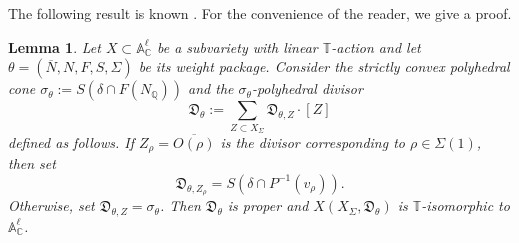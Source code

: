 \documentclass[11pt, reqno]{amsart}
\theoremstyle{plain}
\newtheorem{lemma}[theorem]{Lemma}
\theoremstyle{definition}
\theoremstyle{remark}
\begin{document}
The following result is known \cite[Section 4]{AIPSV12}. For the convenience of the reader, we give a proof.
\begin{lemma}\label{lem-poltheta}
Let $X\subset \mathbb{A}^{\ell}_{\mathbb{C}}$ be a subvariety with linear $\mathbb{T}$-action  and  let $\theta =  (\overline{N}, N, F, S, \Sigma)$ be its weight package. Consider the strictly convex polyhedral cone $\sigma_{\theta}:= S(\delta\cap F(N_{\mathbb{Q}}))$ and the $\sigma_{\theta}$-polyhedral divisor 
$$\mathfrak{D}_{\theta}:= \sum_{Z\subset  X_{\Sigma}} \mathfrak{D}_{\theta, Z}\cdot [Z]$$
defined as follows. If $Z_{\rho} =  \overline{O(\rho)}$ is the divisor corresponding to $\rho\in \Sigma(1)$, then set
$$\mathfrak{D}_{\theta, Z_{\rho}} =  S(\delta\cap P^{-1}(v_{\rho})).$$
 Otherwise, set 
$\mathfrak{D}_{\theta, Z} =  \sigma_{\theta}$. Then  $\mathfrak{D}_{\theta}$ is proper and  $X(X_{\Sigma}, \mathfrak{D}_{\theta})$ is $\mathbb{T}$-isomorphic to $\mathbb{A}_{\mathbb{C}}^{\ell}$.
\end{lemma}
\end{document}
